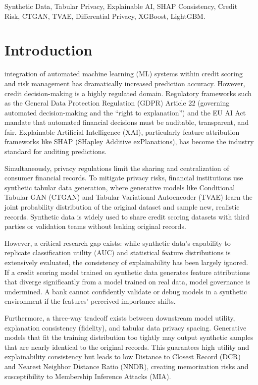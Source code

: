 \documentclass[journal]{IEEEtran}
\begin{document}
\begin{IEEEkeywords}
Synthetic Data, Tabular Privacy, Explainable AI, SHAP Consistency, Credit Risk, CTGAN, TVAE, Differential Privacy, XGBoost, LightGBM.
\end{IEEEkeywords}

\section{Introduction}
\label{sec:introduction}
 integration of automated machine learning (ML) systems within credit scoring and risk management has dramatically increased prediction accuracy. However, credit decision-making is a highly regulated domain. Regulatory frameworks such as the General Data Protection Regulation (GDPR) Article 22 (governing automated decision-making and the ``right to explanation'') and the EU AI Act mandate that automated financial decisions must be auditable, transparent, and fair. Explainable Artificial Intelligence (XAI), particularly feature attribution frameworks like SHAP (SHapley Additive exPlanations), has become the industry standard for auditing predictions.

Simultaneously, privacy regulations limit the sharing and centralization of consumer financial records. To mitigate privacy risks, financial institutions use synthetic tabular data generation, where generative models like Conditional Tabular GAN (CTGAN) and Tabular Variational Autoencoder (TVAE) learn the joint probability distribution of the original dataset and sample new, realistic records. Synthetic data is widely used to share credit scoring datasets with third parties or validation teams without leaking original records.

However, a critical research gap exists: while synthetic data's capability to replicate classification utility (AUC) and statistical feature distributions is extensively evaluated, the consistency of explainability has been largely ignored. If a credit scoring model trained on synthetic data generates feature attributions that diverge significantly from a model trained on real data, model governance is undermined. A bank cannot confidently validate or debug models in a synthetic environment if the features' perceived importance shifts.

Furthermore, a three-way tradeoff exists between downstream model utility, explanation consistency (fidelity), and tabular data privacy spacing. Generative models that fit the training distribution too tightly may output synthetic samples that are nearly identical to the original records. This guarantees high utility and explainability consistency but leads to low Distance to Closest Record (DCR) and Nearest Neighbor Distance Ratio (NNDR), creating memorization risks and susceptibility to Membership Inference Attacks (MIA). 
\end{document}
